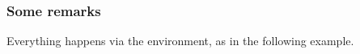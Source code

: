 \documentclass[10pt, a4paper]{article}
\begin{document}

\subsubsection{Some remarks}

Everything happens via the  environment, as in the following example.

\end{document}
